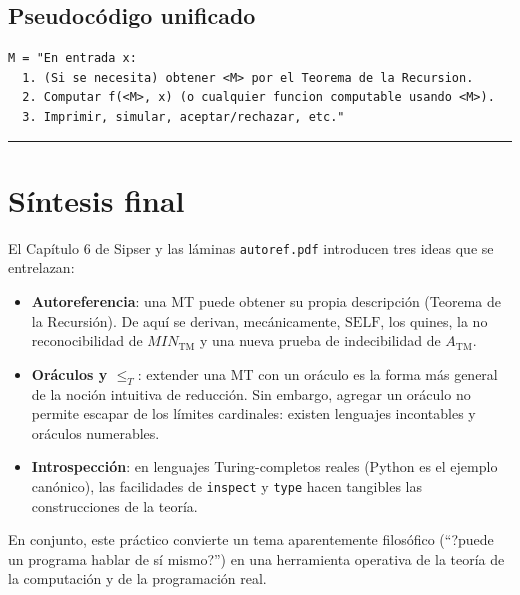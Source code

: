 \documentclass[11pt,a4paper]{article}
\theoremstyle{plain}
\theoremstyle{definition}
\theoremstyle{remark}
\newcommand{\TM}{\mathrm{TM}}
\newcommand{\redT}{\le_{T}}
\newcommand{\ATM}{A_{\TM}}
\newcommand{\MIN}{\mathit{MIN}_{\TM}}
\newcommand{\SELF}{\mathrm{SELF}}
\begin{document}
\subsection*{Pseudoc\'odigo unificado}

\begin{verbatim}
M = "En entrada x:
  1. (Si se necesita) obtener <M> por el Teorema de la Recursion.
  2. Computar f(<M>, x) (o cualquier funcion computable usando <M>).
  3. Imprimir, simular, aceptar/rechazar, etc."
\end{verbatim}

\bigskip\hrule\bigskip

\section*{S\'intesis final}

El Cap\'itulo 6 de Sipser y las l\'aminas \texttt{autoref.pdf} introducen tres
ideas que se entrelazan:

\begin{itemize}
  \item \textbf{Autoreferencia}: una MT puede obtener su propia descripci\'on
        (Teorema de la Recursi\'on). De aqu\'i se derivan, mec\'anicamente,
        $\SELF$, los quines, la no reconocibilidad de $\MIN$ y una nueva
        prueba de indecibilidad de $\ATM$.
  \item \textbf{Or\'aculos y $\redT$}: extender una MT con un or\'aculo es la
        forma m\'as general de la noci\'on intuitiva de reducci\'on. Sin
        embargo, agregar un or\'aculo no permite escapar de los l\'imites
        cardinales: existen lenguajes incontables y or\'aculos numerables.
  \item \textbf{Introspecci\'on}: en lenguajes Turing-completos reales (Python
        es el ejemplo can\'onico), las facilidades de \texttt{inspect} y
        \texttt{type} hacen tangibles las construcciones de la teor\'ia.
\end{itemize}

En conjunto, este pr\'actico convierte un tema aparentemente filos\'ofico
(``\!\!?puede un programa hablar de s\'i mismo?'') en una herramienta
operativa de la teor\'ia de la computaci\'on y de la programaci\'on real.
\end{document}
